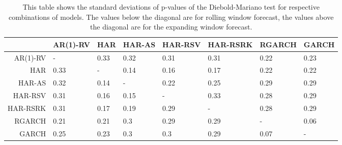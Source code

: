 \begin{table}[ht]
\centering
\begin{tabular}{rlllllll}
  \hline
 & AR(1)-RV & HAR & HAR-AS & HAR-RSV & HAR-RSRK & RGARCH & GARCH \\ 
  \hline
AR(1)-RV & - & 0.33 & 0.32 & 0.31 & 0.31 & 0.22 & 0.23 \\ 
  HAR & 0.33 & - & 0.14 & 0.16 & 0.17 & 0.22 & 0.22 \\ 
  HAR-AS & 0.32 & 0.14 & - & 0.22 & 0.25 & 0.29 & 0.29 \\ 
  HAR-RSV & 0.31 & 0.16 & 0.15 & - & 0.33 & 0.28 & 0.29 \\ 
  HAR-RSRK & 0.31 & 0.17 & 0.19 & 0.29 & - & 0.28 & 0.29 \\ 
  RGARCH & 0.21 & 0.21 & 0.3 & 0.29 & 0.29 & - & 0.06 \\ 
  GARCH & 0.25 & 0.23 & 0.3 & 0.3 & 0.29 & 0.07 & - \\ 
   \hline
\end{tabular}
\caption[DM test standard deviations]{This table shows the standard deviations of p-values of the Diebold-Mariano test for respective combinations of models. 
                The values below the diagonal are for rolling window forecast, the values above the diagonal are for the expanding window forecast.} 
\label{Table:DM_test_SD}
\end{table}
